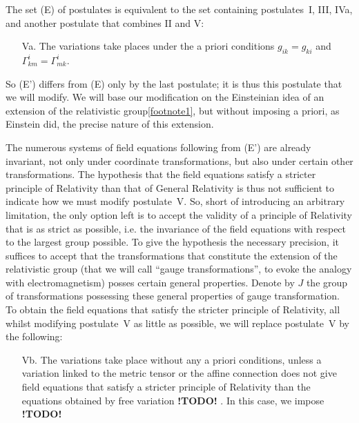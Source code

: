 \documentclass{article}
\theoremstyle{plain}
\theoremstyle{definition}
\newcommand{\todo}{\textbf{ !TODO! }}
\newcommand{\oldpage}[1]{\marginpar{\footnotesize$\Big\vert$ \textit{p.~#1}}}
\begin{document}
The set (E) of postulates is equivalent to the set containing postulates~I, III, IVa, and another postulate that combines II and V:
\begin{enumerate}
  \item[Va.] The variations take places under the a priori conditions $g_{ik}=g_{ki}$ and $\Gamma_{km}^i=\Gamma_{mk}^i$.
\end{enumerate}

So (E') differs from (E) only by the last postulate; it is thus this postulate that we will modify.
We will base our modification on the Einsteinian idea of an extension of the relativistic group\cref{footnote1}, but without imposing a priori, as Einstein did, the precise nature of this extension.

The numerous systems of field equations following from (E') are already invariant, not only under coordinate transformations, but also under certain other transformations.
The hypothesis that the field equations satisfy a stricter principle of Relativity than that of General Relativity is thus not sufficient to indicate how we must modify postulate~V.
So, short of introducing an arbitrary limitation, the only option left is to accept the validity of a principle of Relativity
\oldpage{10-03}
that is as strict as possible, i.e. the invariance of the field equations with respect to the largest group possible.
To give the hypothesis the necessary precision, it suffices to accept that the transformations that constitute the extension of the relativistic group (that we will call ``gauge transformations'', to evoke the analogy with electromagnetism) posses certain general properties.
Denote by $J$ the group of transformations possessing these general properties of gauge transformation.
To obtain the field equations that satisfy the stricter principle of Relativity, all whilst modifying postulate~V as little as possible, we will replace postulate~V by the following:
\begin{enumerate}
  \item[Vb.] The variations take place without any a priori conditions, unless a variation linked to the metric tensor or the affine connection does not give field equations that satisfy a stricter principle of Relativity than the equations obtained by free variation\todo.
    In this case, we impose \todo
\end{enumerate}
\end{document}
